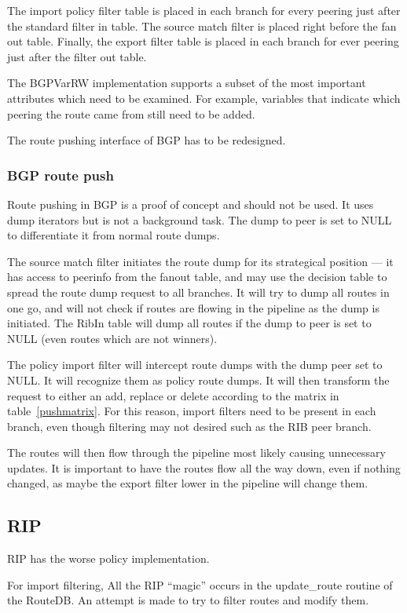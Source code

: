 \documentclass{article}
\begin{document}
The import policy filter table is placed in each branch for every peering just
after the standard filter in table. The source match filter is placed right
before the fan out table. Finally, the export filter table is placed in each
branch for ever peering just after the filter out table.

The BGPVarRW implementation supports a subset of the most important attributes
which need to be examined. For example, variables that indicate which peering
the route came from still need to be added.

The route pushing interface of BGP has to be redesigned.

\subsubsection{BGP route push}
Route pushing in BGP is a proof of concept and should not be used. It uses dump
iterators but is not a background task. The dump to peer is set to NULL to
differentiate it from normal route dumps. 

The source match filter initiates the route dump for its strategical position
--- it has access to peerinfo from the fanout table, and may use the decision
table to spread the route dump request to all branches. It will try to dump all
routes in one go, and will not check if routes are flowing in the pipeline as
the dump is initiated.  The RibIn table will dump all routes if the dump to peer
is set to NULL (even routes which are not winners).

The policy import filter will intercept route dumps with the dump peer set to NULL. It
will recognize them as policy route dumps. It will then transform the request to
either an add, replace or delete according to the matrix in table~\ref{pushmatrix}.
For this reason, import filters need to be present in each branch, even though
filtering may not desired such as the RIB peer branch.

The routes will then flow through the pipeline most likely causing unnecessary
updates. It is important to have the routes flow all the way down, even if
nothing changed, as maybe the export filter lower in the pipeline will change them.


\subsection{RIP}
RIP has the worse policy implementation. 

For import filtering, All the RIP ``magic'' occurs in the update\_route routine
of the RouteDB. An attempt is made to try to filter routes and modify them.
\end{document}
